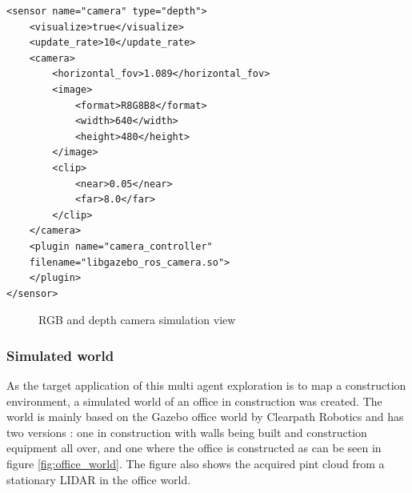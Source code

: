 \documentclass[11pt]{article}
\begin{document}
\vspace{10pt }
\begin{minipage}{0.9\textwidth}      
\begin{lstlisting}[style=xmlStyle, caption={Depth Camera Sensor Configuration}, label={lst:depth_camera_sensor}]
<sensor name="camera" type="depth">
    <visualize>true</visualize>
    <update_rate>10</update_rate>
    <camera>
        <horizontal_fov>1.089</horizontal_fov>
        <image>
            <format>R8G8B8</format>
            <width>640</width>
            <height>480</height>
        </image>
        <clip>
            <near>0.05</near>
            <far>8.0</far>
        </clip>
    </camera>
    <plugin name="camera_controller" 
    filename="libgazebo_ros_camera.so">
    </plugin>
</sensor>
\end{lstlisting}
\end{minipage}

\begin{figure}[H]
    \centering
    \caption{RGB and depth camera simulation view}
    \label{fig:cameras_simulation_view}
\end{figure}

    \subsubsection{Simulated world}

    As the target application of this multi agent exploration is to map a construction environment, a simulated world of an office in construction was created. The world is mainly based on the Gazebo office world by Clearpath Robotics and has two versions : one in construction with walls being built and construction equipment all over, and one where the office is constructed as can be seen in figure \ref{fig:office_world}. The figure also shows the acquired pint cloud from a stationary LIDAR in the office world. 
\end{document}
